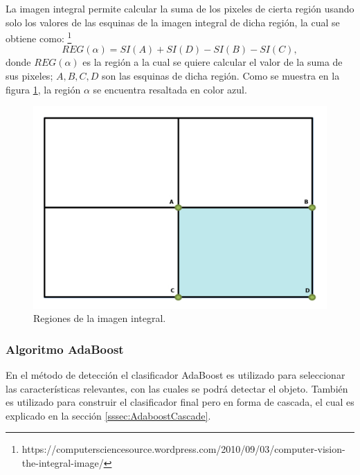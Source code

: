 La imagen integral permite calcular la suma de los pixeles de cierta región usando solo los valores de las esquinas de la imagen integral de dicha región, la cual se obtiene como: \footnote{https://computersciencesource.wordpress.com/2010/09/03/computer-vision-the-integral-image/}    
\begin{equation}
REG(\alpha)=SI(A)+SI(D)-SI(B)-SI(C),
\end{equation}
donde $REG(\alpha)$ es la región a la cual se quiere calcular el valor de la suma de sus pixeles; $A,B,C,D$ son las esquinas de dicha región. Como se muestra en la figura \ref{fig:figImageIntegral}, la región $\alpha$ se encuentra resaltada en color azul.  
\begin{figure}[h!]
\begin{center}
\includegraphics[scale=.25]{./Figures/IntegralImage.png}
\end{center}
\caption{Regiones de la imagen integral.}
\label{fig:figImageIntegral}
\end{figure} 


\subsubsection{Algoritmo AdaBoost}\label{sssec:AdaboostClasifier}  

En el método de detección el clasificador AdaBoost es utilizado para seleccionar las características relevantes, con las cuales se podrá detectar el objeto. También es utilizado para construir el clasificador final pero en forma de cascada, el cual es explicado en la sección \ref{sssec:AdaboostCascade}. 


